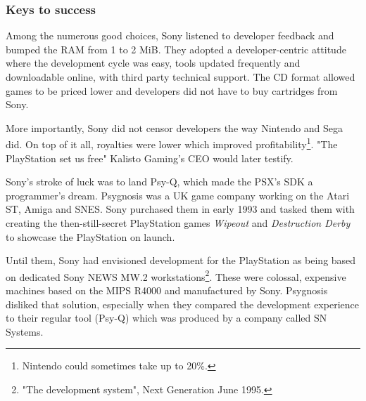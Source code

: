 
\vspace{-20pt}
\subsubsection{Keys to success}
\par
 Among the numerous good choices, Sony listened to developer feedback and bumped the RAM from 1 to 2 MiB. They adopted a developer-centric attitude where the development cycle was easy, tools updated frequently and downloadable online, with third party technical support. The CD format allowed games to be priced lower and developers did not have to buy cartridges from Sony.\\
 \par
  More importantly, Sony did not censor developers the way Nintendo and Sega did. On top of it all, royalties were lower which improved profitability\footnote{Nintendo could sometimes take up to 20\%.}. "The PlayStation set us free" Kalisto Gaming's CEO would later testify.\\
\par
Sony's stroke of luck was to land Psy-Q, which made the PSX's SDK a programmer's dream. Psygnosis was a UK game company working on the Atari ST, Amiga and SNES. Sony purchased them in early 1993 and tasked them with creating the then-still-secret PlayStation games \textit{Wipeout} and \textit{Destruction Derby} to showcase the PlayStation on launch.\\
\par
Until them, Sony had envisioned development for the PlayStation as being based on dedicated Sony NEWS MW.2 workstations\footnote{"The development system", Next Generation June 1995.}. These were colossal, expensive machines based on the MIPS R4000 and manufactured by Sony. Psygnosis disliked that solution, especially when they compared the development experience to their regular tool (Psy-Q) which was produced by a company called SN Systems.\\

